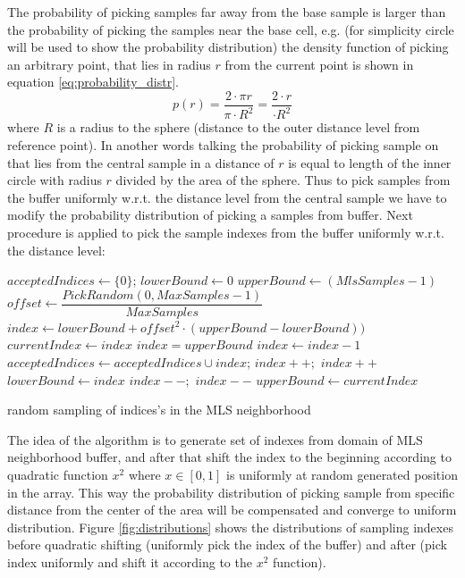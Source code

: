 The probability of picking samples far away from the base sample is larger than the probability of picking the samples near the base cell, e.g. (for simplicity circle will be used to show the probability distribution) the density function of picking an arbitrary point, that lies in radius $r$ from the current point is shown in equation \ref{eq:probability_distr}.
\begin{equation}
	p(r) = \dfrac{2 \cdot \pi r}{\pi \cdot R^2} = \dfrac{2 \cdot r}{\cdot R^2}
	\label{eq:probability_distr}
\end{equation}
where $R$ is a radius to the sphere (distance to the outer distance level from reference point). In another words talking the probability of picking sample on that lies from the central sample in a distance of $r$ is equal to length of the inner circle with radius $r$ divided by the area of the sphere.
Thus to pick samples from the buffer uniformly w.r.t. the distance level from the central sample we have to modify the probability distribution of picking a samples from buffer. Next procedure is applied to pick the sample indexes from the buffer uniformly w.r.t. the distance level:
\begin{algorithm}[H]
	\scriptsize
	\begin{algorithmic}
			\State $acceptedIndices \gets \{0\}$;
			\State $lowerBound \gets 0$
			\State $upperBound \gets (MlsSamples - 1)$
				\State $offset \gets \dfrac{PickRandom(0, MaxSamples - 1)}{MaxSamples}$
				\State $index \gets lowerBound + offset^2 \cdot (upperBound - lowerBound))$
				\State $currentIndex \gets index$
						\State $index = upperBound$
					\Else
						\State $index \gets index - 1$
					\EndIf
				\EndWhile
				\State $acceptedIndices \gets acceptedIndices \cup index$;
					\State $index++;$
						\State $index++$
					\EndWhile
					\State $lowerBound \gets index$
				\Else 
						\State $index--;$
							\State $index--$
						\EndWhile
						\State $upperBound \gets currentIndex$
					\EndIf
				\EndIf
			\EndFor
	\end{algorithmic}
	\caption{random sampling of indices's in the MLS neighborhood}
	\label{alg:mls_montecarlo_sampling}
\end{algorithm}
The idea of the algorithm is to generate set of indexes from domain of MLS neighborhood buffer, and after that shift the index to the beginning according to quadratic function $x^2$ where $x\in [0,1]$ is uniformly at random generated position in the array. This way the probability distribution of picking sample from specific distance from the center of the area will be compensated and converge to uniform distribution. Figure \ref{fig:distributions} shows the distributions of sampling indexes before quadratic shifting (uniformly pick the index of the buffer) and after (pick index uniformly and shift it according to the $x^2$ function).\\
